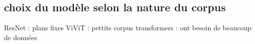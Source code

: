 \subsection{choix du modèle selon la nature du corpus}

ResNet : plans fixes
ViViT : pettits corpus
transformers : ont besoin de beaucoup de données 
